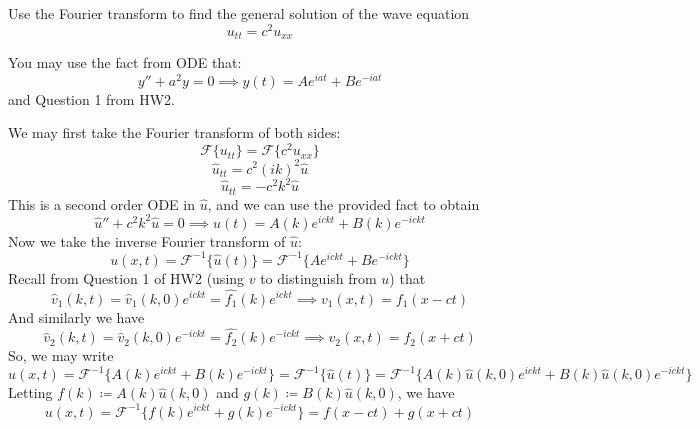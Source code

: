 \documentclass[plain]{pset}
\begin{document}
\begin{problem}
Use the Fourier transform to find the general solution of the wave equation
\[u_{tt} = c^2u_{xx}\]
\begin{hint*}
    You may use the fact from ODE that:
    \[y'' + a^2y = 0 \implies y(t) = Ae^{iat} + Be^{-iat}\]
    and Question 1 from HW2.
\end{hint*}
\end{problem}
\begin{solution}
    We may first take the Fourier transform of both sides:
    \[\mathcal{F}\{u_{tt}\} = \mathcal{F}\{c^2u_{xx}\}\]
    \[\hat{u}_{tt} = c^2(ik)^2\hat{u}\]
    \[\hat{u}_{tt} = -c^2k^2\hat{u}\]
    This is a second order ODE in \(\hat{u}\), and we can use the provided fact to obtain
    \[\hat{u}'' + c^2k^2\hat{u} = 0 \implies \hat{u}(t) = A(k)e^{ickt} + B(k)e^{-ickt}\]
    Now we take the inverse Fourier transform of \(\hat{u}\):
    \[u(x, t) = \mathcal{F}^{-1}\{\hat{u}(t)\} = \mathcal{F}^{-1}\{Ae^{ickt} + Be^{-ickt}\}\]
    Recall from Question 1 of HW2 (using \(v\) to distinguish from \(u\)) that
    \[\hat{v}_1(k, t) = \hat{v}_1(k, 0)e^{ickt} = \hat{f_1}(k)e^{ickt} \implies v_1(x, t) = f_1(x - ct)\]
    And similarly we have
    \[\hat{v}_2(k, t) = \hat{v}_2(k, 0)e^{-ickt} = \hat{f_2}(k)e^{-ickt} \implies v_2(x, t) = f_2(x + ct)\]
    So, we may write
    \[u(x, t) = \mathcal{F}^{-1}\{A(k)e^{ickt} + B(k)e^{-ickt}\} = \mathcal{F}^{-1}\{\hat{u}(t)\} = \mathcal{F}^{-1}\{A(k)\hat{u}(k, 0)e^{ickt} + B(k)\hat{u}(k, 0)e^{-ickt}\}\]
    Letting \(f(k) \coloneqq A(k)\hat{u}(k, 0)\) and \(g(k) \coloneqq B(k)\hat{u}(k, 0)\), we have
    \[u(x, t) = \mathcal{F}^{-1}\{f(k)e^{ickt} + g(k)e^{-ickt}\} = f(x - ct) + g(x + ct)\]
\end{solution}

\pagebreak
\end{document}
